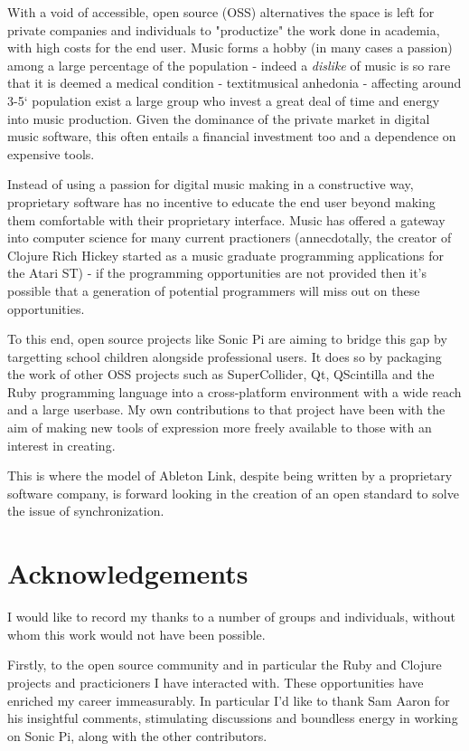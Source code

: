 \documentclass[11pt]{article} %
\theoremstyle{plain}
\theoremstyle{definition}
\begin{document}
With a void of accessible, open source (OSS) alternatives the space is left for
private companies and individuals to "productize" the work done in academia,
with high costs for the end user. Music forms a hobby (in many cases a passion)
among a large percentage of the population - indeed a \textit{dislike} of music
is so rare that it is deemed a medical condition - textit{musical anhedonia} -
affecting around 3-5\char`%
population exist a large group who invest a great deal of time and energy into
music production. Given the dominance of the private market in digital music
software, this often entails a financial investment too and a dependence on
expensive tools.

Instead of using a passion for digital music making in a constructive way,
proprietary software has no incentive to educate the end user beyond making
them comfortable with their proprietary interface. Music has offered a
gateway into computer science for many current practioners (annecdotally, the
creator of Clojure Rich Hickey started as a music graduate programming
applications for the Atari ST) - if the programming opportunities are not
provided then it's possible that a generation of potential programmers will
miss out on these opportunities.

To this end, open source projects like Sonic Pi\cite{sonicpi} are aiming to
bridge this gap by targetting school children alongside professional users. It
does so by packaging the work of other OSS projects such as SuperCollider, Qt,
QScintilla and the Ruby programming language into a cross-platform environment
with a wide reach and a large userbase. My own contributions to that project
have been with the aim of making new tools of expression more freely available
to those with an interest in creating.

This is where the model of Ableton Link, despite being written by a proprietary
software company, is forward looking in the creation of an open standard to
solve the issue of synchronization.

\section{Acknowledgements}

I would like to record my thanks to a number of groups and individuals, without
whom this work would not have been possible.

Firstly, to the open source community and in particular the Ruby and Clojure
projects and practicioners I have interacted with. These opportunities have
enriched my career immeasurably. In particular I'd like to thank Sam Aaron for
his insightful comments, stimulating discussions and boundless energy in
working on Sonic Pi, along with the other contributors.
\end{document}
